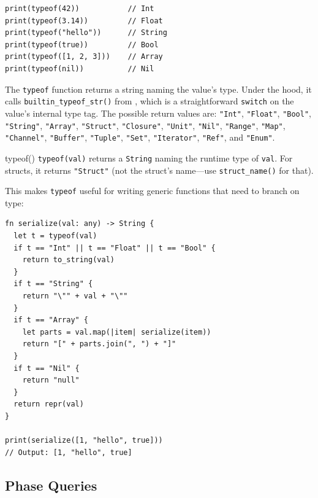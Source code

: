 \begin{lstlisting}[language=Lattice, caption={Querying types at runtime}]
print(typeof(42))           // Int
print(typeof(3.14))         // Float
print(typeof("hello"))      // String
print(typeof(true))         // Bool
print(typeof([1, 2, 3]))    // Array
print(typeof(nil))          // Nil
\end{lstlisting}

The \lstinline|typeof| function returns a string naming the value's type.
Under the hood, it calls \lstinline|builtin_typeof_str()| from , which is a straightforward \lstinline|switch| on the value's internal type tag.
The possible return values are: \lstinline|"Int"|, \lstinline|"Float"|, \lstinline|"Bool"|, \lstinline|"String"|, \lstinline|"Array"|, \lstinline|"Struct"|, \lstinline|"Closure"|, \lstinline|"Unit"|, \lstinline|"Nil"|, \lstinline|"Range"|, \lstinline|"Map"|, \lstinline|"Channel"|, \lstinline|"Buffer"|, \lstinline|"Tuple"|, \lstinline|"Set"|, \lstinline|"Iterator"|, \lstinline|"Ref"|, and \lstinline|"Enum"|.

\begin{defnbox}{typeof()}
\lstinline|typeof(val)| returns a \lstinline|String| naming the runtime type of \lstinline|val|.
For structs, it returns \lstinline|"Struct"| (not the struct's name---use \lstinline|struct_name()| for that).
\end{defnbox}

This makes \lstinline|typeof| useful for writing generic functions that need to branch on type:

\begin{lstlisting}[language=Lattice, caption={A generic serializer using typeof}]
fn serialize(val: any) -> String {
  let t = typeof(val)
  if t == "Int" || t == "Float" || t == "Bool" {
    return to_string(val)
  }
  if t == "String" {
    return "\"" + val + "\""
  }
  if t == "Array" {
    let parts = val.map(|item| serialize(item))
    return "[" + parts.join(", ") + "]"
  }
  if t == "Nil" {
    return "null"
  }
  return repr(val)
}

print(serialize([1, "hello", true]))
// Output: [1, "hello", true]
\end{lstlisting}

\subsection{Phase Queries}


